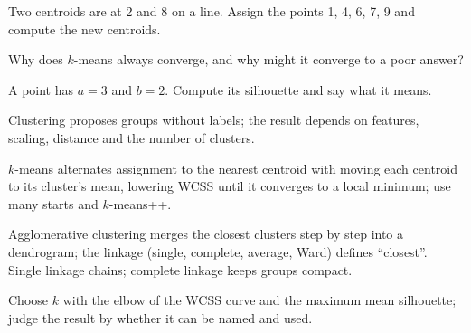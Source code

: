 \begin{checkpoint}
\begin{tightnum}
  \item Two centroids are at 2 and 8 on a line. Assign the points 1, 4, 6, 7, 9 and
        compute the new centroids.
  \item Why does $k$-means always converge, and why might it converge to a poor
        answer?
  \item A point has $a = 3$ and $b = 2$. Compute its silhouette and say what it
        means.
\end{tightnum}
\end{checkpoint}

\begin{chaptersummary}
\begin{tight}
  \item Clustering proposes groups without labels; the result depends on features,
        scaling, distance and the number of clusters.
  \item $k$-means alternates assignment to the nearest centroid with moving each
        centroid to its cluster's mean, lowering WCSS until it converges to a local
        minimum; use many starts and $k$-means++.
  \item Agglomerative clustering merges the closest clusters step by step into a
        dendrogram; the linkage (single, complete, average, Ward) defines
        ``closest''. Single linkage chains; complete linkage keeps groups compact.
  \item Choose $k$ with the elbow of the WCSS curve and the maximum mean
        silhouette; judge the result by whether it can be named and used.
\end{tight}
\end{chaptersummary}

